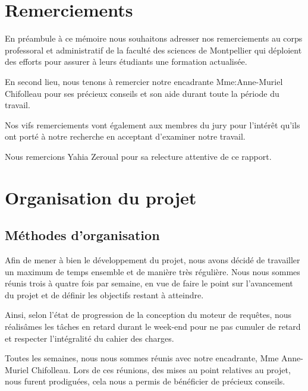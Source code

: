 \documentclass[oneside,13pt,a4paper]{report}
\begin{document}
\chapter*{Remerciements}
\begin{center}

En préambule à ce mémoire nous souhaitons adresser nos remerciements au corps professoral et administratif de la faculté des sciences de Montpellier qui déploient des efforts pour assurer à leurs étudiants une formation actualisée.

En second lieu, nous tenons à remercier notre encadrante Mme:Anne-Muriel Chifolleau pour ses précieux conseils et son aide durant toute la période du travail.

Nos vifs remerciements vont également aux membres du jury pour l’intérêt qu’ils ont porté à notre recherche en acceptant d’examiner notre travail.

Nous remercions Yahia Zeroual pour sa relecture attentive de ce rapport.

\end{center}

\parskip=0pt
\tableofcontents

\parskip=5pt

\chapter{Organisation du projet}
\section{Méthodes d’organisation}

Afin de mener à bien le développement du projet, nous avons décidé de travailler un maximum de temps ensemble et de manière très régulière. Nous nous sommes réunis trois à quatre fois par semaine, en vue de faire le point sur l'avancement du projet et de définir les objectifs restant à atteindre.

Ainsi, selon l'état de progression de la conception du moteur de requêtes, nous réalisâmes les tâches en retard durant le week-end pour ne pas cumuler de retard et respecter l'intégralité du cahier des charges.

Toutes les semaines, nous nous sommes réunis avec notre encadrante, Mme Anne-Muriel Chifolleau. Lors de ces réunions, des mises au point relatives au projet, nous furent prodiguées, cela nous a permis de bénéficier de précieux conseils.
\end{document}
